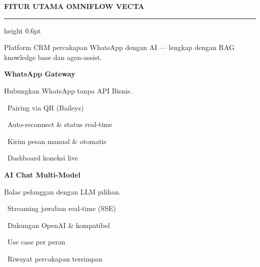 \documentclass[a4paper]{article}
\newcommand{\sectiontitle}[1]{%
    \vspace{10pt}%
    {\fontsize{13}{16}\selectfont\bfseries\color{BlueDark} #1}\par\vspace{3pt}%
    {\color{BluePrimary}\hrule height 0.6pt}\par\vspace{8pt}%
}
\begin{document}
\sectiontitle{FITUR UTAMA OMNIFLOW VECTA}

{\fontsize{9.5}{13}\selectfont\color{TextLight} Platform CRM percakapan WhatsApp dengan AI --- lengkap dengan RAG knowledge base dan agen-assist.}

\vspace{6pt}

\noindent
\begin{minipage}[t]{0.485\textwidth}
    \colorbox{BluePrimary}{%
        \begin{minipage}{\dimexpr\textwidth-2\fboxsep\relax}
            {\fontsize{10}{13}\selectfont\bfseries\color{White} WhatsApp Gateway}
        \end{minipage}}\par
    \vspace{4pt}
    {\fontsize{9}{12}\selectfont\color{TextDark}%
    Hubungkan WhatsApp tanpa API Bisnis.\par\vspace{3pt}
    \textbullet\ Pairing via QR (Baileys)\par\vspace{2pt}%
    \textbullet\ Auto-reconnect \& status real-time\par\vspace{2pt}%
    \textbullet\ Kirim pesan manual \& otomatis\par\vspace{2pt}%
    \textbullet\ Dashboard koneksi live}%

\end{minipage}%
\hfill
\begin{minipage}[t]{0.485\textwidth}
    \colorbox{EmeraldPrimary}{%
        \begin{minipage}{\dimexpr\textwidth-2\fboxsep\relax}
            {\fontsize{10}{13}\selectfont\bfseries\color{White} AI Chat Multi-Model}
        \end{minipage}}\par
    \vspace{4pt}
    {\fontsize{9}{12}\selectfont\color{TextDark}%
    Balas pelanggan dengan LLM pilihan.\par\vspace{3pt}
    \textbullet\ Streaming jawaban real-time (SSE)\par\vspace{2pt}%
    \textbullet\ Dukungan OpenAI \& kompatibel\par\vspace{2pt}%
    \textbullet\ Use case per peran\par\vspace{2pt}%
    \textbullet\ Riwayat percakapan tersimpan}%

\end{minipage}
\end{document}
